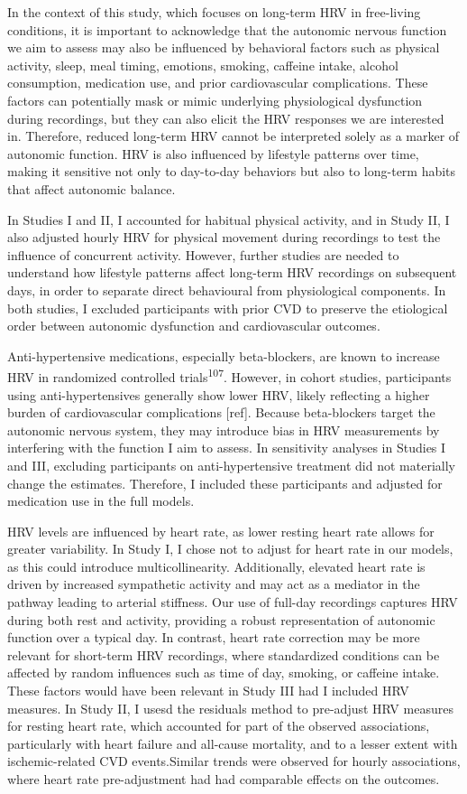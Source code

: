 \documentclass[
  a4paper,
  headsepline=true,
  open=any]{scrbook}
\begin{document}
In the context of this study, which focuses on long-term HRV in
free-living conditions, it is important to acknowledge that the
autonomic nervous function we aim to assess may also be influenced by
behavioral factors such as physical activity, sleep, meal timing,
emotions, smoking, caffeine intake, alcohol consumption, medication use,
and prior cardiovascular complications. These factors can potentially
mask or mimic underlying physiological dysfunction during recordings,
but they can also elicit the HRV responses we are interested in.
Therefore, reduced long-term HRV cannot be interpreted solely as a
marker of autonomic function. HRV is also influenced by lifestyle
patterns over time, making it sensitive not only to day-to-day behaviors
but also to long-term habits that affect autonomic balance.

In Studies I and II, I accounted for habitual physical activity, and in
Study II, I also adjusted hourly HRV for physical movement during
recordings to test the influence of concurrent activity. However,
further studies are needed to understand how lifestyle patterns affect
long-term HRV recordings on subsequent days, in order to separate direct
behavioural from physiological components. In both studies, I excluded
participants with prior CVD to preserve the etiological order between
autonomic dysfunction and cardiovascular outcomes.

Anti-hypertensive medications, especially beta-blockers, are known to
increase HRV in randomized controlled trials\textsuperscript{107}.
However, in cohort studies, participants using anti-hypertensives
generally show lower HRV, likely reflecting a higher burden of
cardiovascular complications {[}ref{]}. Because beta-blockers target the
autonomic nervous system, they may introduce bias in HRV measurements by
interfering with the function I aim to assess. In sensitivity analyses
in Studies I and III, excluding participants on anti-hypertensive
treatment did not materially change the estimates. Therefore, I included
these participants and adjusted for medication use in the full models.

HRV levels are influenced by heart rate, as lower resting heart rate
allows for greater variability. In Study I, I chose not to adjust for
heart rate in our models, as this could introduce multicollinearity.
Additionally, elevated heart rate is driven by increased sympathetic
activity and may act as a mediator in the pathway leading to arterial
stiffness. Our use of full-day recordings captures HRV during both rest
and activity, providing a robust representation of autonomic function
over a typical day. In contrast, heart rate correction may be more
relevant for short-term HRV recordings, where standardized conditions
can be affected by random influences such as time of day, smoking, or
caffeine intake. These factors would have been relevant in Study III had
I included HRV measures. In Study II, I usesd the residuals method to
pre-adjust HRV measures for resting heart rate, which accounted for part
of the observed associations, particularly with heart failure and
all-cause mortality, and to a lesser extent with ischemic-related CVD
events.Similar trends were observed for hourly associations, where heart
rate pre-adjustment had had comparable effects on the outcomes.
\end{document}
